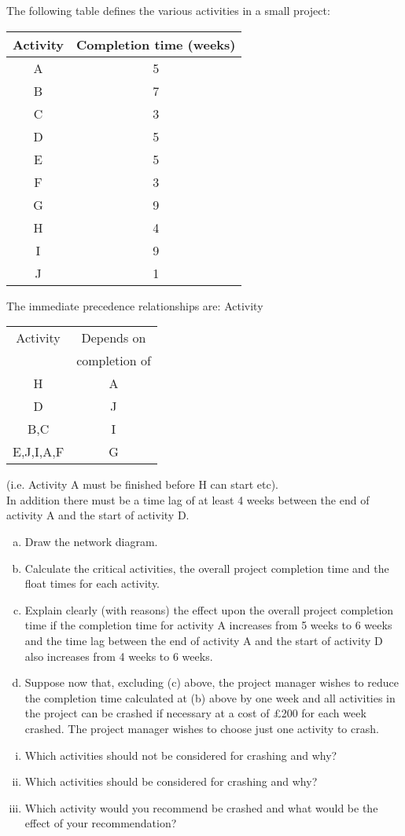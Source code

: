 \documentclass[a4paper,12pt]{article}
\begin{document}
\noindent The following table defines the various activities in a small project: 
\begin{center}
\begin{tabular}{|c|c|} \hline
Activity & Completion time (weeks) \\ \hline
A & 5 \\ \hline
B & 7 \\ \hline
C & 3 \\ \hline
D & 5 \\ \hline
E & 5 \\ \hline
F & 3 \\ \hline
G & 9 \\ \hline
H & 4 \\ \hline
I & 9 \\ \hline
J & 1 \\ \hline
\end{tabular}
\end{center}
\noindent The immediate precedence relationships are: Activity 
\begin{center}
\begin{tabular}{|c|c|}\hline
Activity & Depends on  \\
         & completion of \\
         \hline
H & A \\ \hline
D & J \\ \hline
B,C & I \\ \hline
E,J,I,A,F & G \\ \hline
\end{tabular}
\end{center}
(i.e. Activity A must be finished before H can start etc).\\


\noindent In addition there must be a time lag of at least 4 weeks between the end of activity A and the start of activity D. 
\begin{enumerate}[(a)]
    \item Draw the network diagram. 
    \item Calculate the critical activities, the overall project completion time and the float times for each activity. 
    \item Explain clearly (with reasons) the effect upon the overall project completion time if the completion time for activity A increases from 5 weeks to 6 weeks and the time lag between the end of activity A and the start of activity D also increases from 4 weeks to 6 weeks. 
\item  Suppose now that, excluding (c) above, the project manager wishes to reduce the completion time calculated at (b) above by one week and all activities in the project can be crashed if necessary at a cost of £200 for each week crashed. The project manager wishes to choose just one activity to crash. 
\end{enumerate}

\begin{enumerate}[(i)]
    \item Which activities should not be considered for crashing and why? 
    \item Which activities should be considered for crashing and why? 
    \item Which activity would you recommend be crashed and what would be the effect of your recommendation?
\end{enumerate} 
\end{document}
